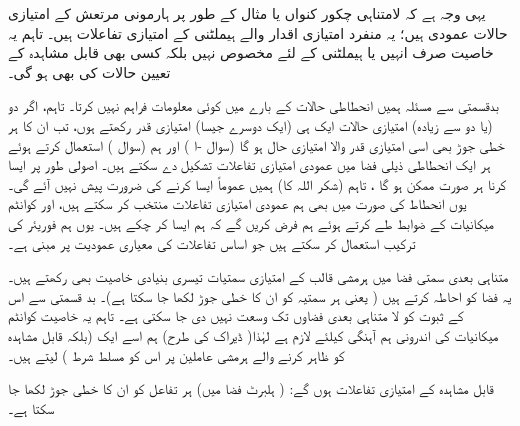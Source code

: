 یہی وجہ ہے کہ لامتناہی چکور کنواں یا مثال کے طور پر ہارمونی مرتعش کے امتیازی حالات عمودی ہیں؛   یہ منفرد امتیازی اقدار والے  ہیملٹنی کے امتیازی تفاعلات   ہیں۔  تاہم  یہ خاصیت صرف انہیں    یا  ہیملٹنی کے لئے  مخصوص  نہیں    بلکہ کسی بھی قابل مشاہدہ  کے تعیین  حالات کی بھی ہو گی۔

  بدقسمتی سے مسئلہ    ہمیں انحطاطی حالات  کے بارے میں کوئی معلومات فراہم نہیں کرتا۔  تاہم،  اگر دو (یا دو سے زیادہ)  امتیازی حالات ایک ہی (ایک دوسرے جیسا)  امتیازی قدر رکھتے ہوں،  تب ان کا  ہر خطی جوڑ  بھی اسی امتیازی قدر والا امتیازی حال ہو گا  (سوال -ا  )  اور ہم  (سوال )  استعمال کرتے ہوئے ہر ایک انحطاطی ذیلی فضا  میں عمودی امتیازی تفاعلات  تشکیل دے  سکتے ہیں۔  اصولی طور پر  ایسا کرنا ہر صورت  ممکن ہو گا ،  تاہم (شکر اللہ کا)  ہمیں عموماً    ایسا کرنے کی ضرورت پیش نہیں آئے گی۔  یوں انحطاط کی صورت  میں بھی ہم عمودی امتیازی تفاعلات  منتخب کر سکتے ہیں،   اور کوانٹم میکانیات کے ضوابط  طے کرتے ہوئے ہم فرض کریں گے  کہ ہم ایسا کر چکے ہیں۔  یوں ہم فوریئر کی ترکیب استعمال کر سکتے ہیں   جو   اساس تفاعلات   کی معیاری عمودیت پر مبنی ہے۔
  
     متناہی بعدی  سمتی  فضا  میں ہرمشی قالب کے امتیازی سمتیات   تیسری بنیادی خاصیت بھی رکھتے ہیں۔  یہ  فضا  کو احاطہ کرتے ہیں (  یعنی ہر سمتیہ کو ان کا خطی جوڑ لکھا جا سکتا ہے)۔  بد قسمتی سے اس کے  ثبوت کو  لا متناہی بعدی   فضاوں   تک وسعت  نہیں دی جا سکتی  ہے۔  تاہم یہ خاصیت کوانٹم میکانیات کی اندرونی ہم آہنگی کیلئے لازم ہے   لہٰذا(   ڈیراک کی طرح)  ہم اسے ایک    (بلکہ  قابل مشاہدہ کو ظاہر کرنے والے ہرمشی عاملین پر اس  کو مسلط شرط ) لیتے ہیں۔
     
 قابل مشاہدہ  کے امتیازی تفاعلات   ہوں گے:  ( ہلبرٹ  فضا  میں) ہر تفاعل کو ان کا خطی جوڑ لکھا جا سکتا ہے۔ 

